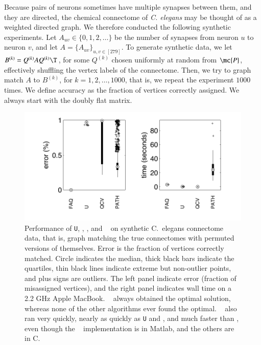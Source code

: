 \documentclass[preprint,11pt]{elsarticle}
\begin{document}
Because pairs of neurons sometimes have multiple synapses between them, and they are directed, the chemical connectome of \emph{C. elegans} may be thought of as a weighted directed graph.
We therefore conducted the following synthetic experiments.  
Let $A_{uv} \in \{0,1,2,\ldots\}$ be the number of synapses from neuron $u$ to neuron $v$, and let $A=\{A_{uv}\}_{u,v \in [279]}$.  To generate synthetic data, we let $B^{(k)}=Q^{(k)} A {Q^{(k)}}\T$, for some $Q^{(k)}$ chosen uniformly at random from $\mc{P}$, effectively shuffling the vertex labels of the connectome.  Then, we try to graph match $A$ to $B^{(k)}$, for  $k =1,2,\ldots, 1000$, that is, we repeat the experiment $1000$ times.  We define accuracy as the fraction of vertices correctly assigned. We always start with the doubly flat matrix.


\begin{figure}[htbp]
	\centering
		\includegraphics[width=0.7\linewidth]{../figs/chemicalConnectome.pdf}
	\caption{Performance of \texttt{U}, \Qcv, \Path, and \FAQ~ on synthetic C.~elegans connectome data, that is, graph matching the true connectomes with permuted versions of themselves.  Error is the fraction of vertices correctly matched.  Circle indicates the median, thick black bars indicate the quartiles, thin black lines indicate extreme but non-outlier points, and plus signs are outliers. The left panel indicate error (fraction of misassigned vertices), and the right panel indicates wall time on a 2.2 GHz Apple MacBook.   \FAQ~ always obtained the optimal solution, whereas none of the other algorithms ever found the optimal.    \FAQ~ also ran very quickly, nearly as quickly as \texttt{U} and \Qcv, and much faster than \Path, even though the \FAQ~ implementation is in Matlab, and the others are in C.}
	\label{fig:connectomes}
\end{figure}
\end{document}
